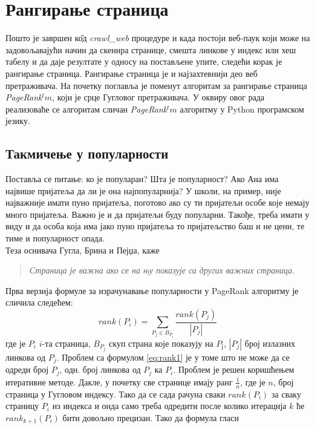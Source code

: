 	\section{Рангирање страница}
	Пошто је завршен к\^{о}д \emph{crawl\_web} процедуре и када постоји веб-паук који може на задовољавајући начин да скенира странице, смешта линкове у индекс или хеш табелу и да даје резултате у односу на постављене упите, следећи корак је рангирање страница. Рангирање страница је и најзахтевнији део веб претраживача. На почетку поглавља је поменут алгоритам за рангирање страница \emph{PageRank}$^tm$, који је срце Гугловог претраживача. У оквиру овог рада реализоваће се алгоритам сличан \emph{PageRank}$^tm$ алгоритму у Python програмском језику. 
		\subsection{Такмичење у популарности}
		Поставља се питање: ко је популаран? Шта је популарност? Ако Ана има највише пријатеља да ли је она најпопуларнија? У школи, на пример, није најважније имати пуно пријатеља, поготово ако су ти пријатељи особе које немају много пријатеља. Важно је и да пријатељи буду популарни. Такође, треба имати у виду и да особа која има јако пуно пријатеља то пријатељство баш и не цени, те тиме и популарност опада.\\
		Теза оснивача Гугла, Брина и Пејџа, каже\cite[Ch 4]{langville2011google} \begin{quote}
		\textit{Страница је важна ако се на њу показује са других важних страница.}
		\end{quote}
		Прва верзија формуле за израчунавање популарности у PageRank алгоритму је сличила следећем:
		\begin{equation}\label{eq:rank1}
		rank(P_{i})=\sum_{P_{j}\in B_{P_{i}}}\frac{rank(P_{j})}{\left |P_{j}  \right |}
		\end{equation}
		где је $P_{i}$ $i$-та страница, $B_{P_{j}}$ скуп страна које показују на $P_{ј}$, $\left |P_{j}  \right |$ број излазних линкова од $P_{j}$. Проблем са формулом \ref{eq:rank1} је у томе што не може да се одреди број $P_{j}$, одн. број линкова од $P_{j}$ ка $P_{i}$. Проблем је решен коришћењем итеративне методе. Дакле, у почетку све странице имају ранг $\frac{1}{n}$, где је $n$, број страница у Гугловом индексу. Тако да се сада рачуна сваки $rank(P_{i})$ за сваку страницу $P_{i}$ из индекса и онда само треба одредити после колико итерација $k$ ће $rank_{k+1}(P_{i})$ бити довољно прецизан. Тако да формула гласи\cite[Ch 4.1]{langville2011google}
